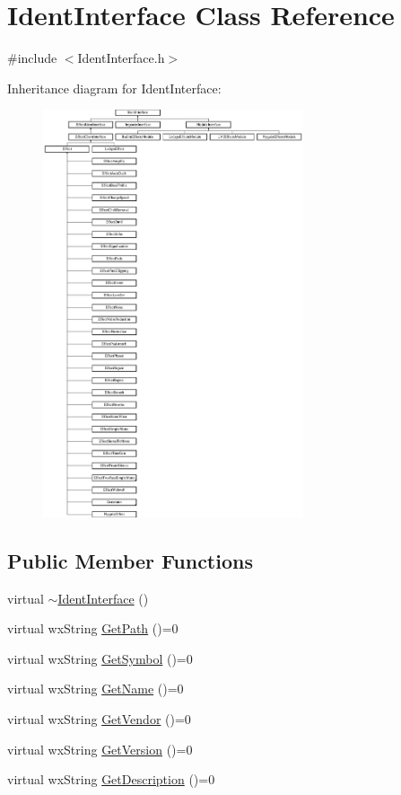 \hypertarget{class_ident_interface}{}\section{Ident\+Interface Class Reference}
\label{class_ident_interface}


{\ttfamily \#include $<$Ident\+Interface.\+h$>$}

Inheritance diagram for Ident\+Interface\+:\begin{figure}[H]
\begin{center}
\leavevmode
\includegraphics[height=12.000000cm]{class_ident_interface}
\end{center}
\end{figure}
\subsection*{Public Member Functions}
\begin{DoxyCompactItemize}
\item 
virtual \hyperlink{class_ident_interface_a9c79f400b62f0b89d1dd127585545330}{$\sim$\+Ident\+Interface} ()
\item 
virtual wx\+String \hyperlink{class_ident_interface_a5893011e66fdbd59b07be2a50599057e}{Get\+Path} ()=0
\item 
virtual wx\+String \hyperlink{class_ident_interface_aaac0b262068534879c58d0536438d859}{Get\+Symbol} ()=0
\item 
virtual wx\+String \hyperlink{class_ident_interface_a0e4f2c9b9ee3a3628742c2c6fa4c49a5}{Get\+Name} ()=0
\item 
virtual wx\+String \hyperlink{class_ident_interface_a7ccfff90636d0f31e32e6f364fe0d141}{Get\+Vendor} ()=0
\item 
virtual wx\+String \hyperlink{class_ident_interface_a8befacbb7ebf203ac0ddd71852c2b046}{Get\+Version} ()=0
\item 
virtual wx\+String \hyperlink{class_ident_interface_a753793e6231fc34d48b263698ed4b55f}{Get\+Description} ()=0
\end{DoxyCompactItemize}


